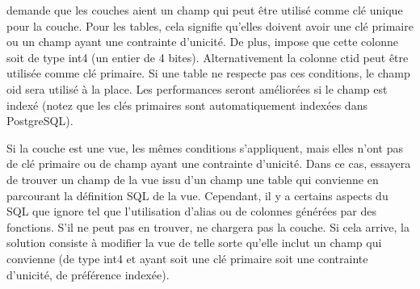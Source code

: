 \qg demande que les couches \psq aient un champ qui peut être utilisé comme clé unique pour la couche. Pour les tables, cela signifie qu'elles doivent avoir une clé primaire ou un champ ayant une contrainte d'unicité. De plus, \qg impose que cette colonne soit de type int4 (un entier de 4 bites). Alternativement la colonne ctid peut être utilisée comme clé primaire. Si une table ne respecte pas ces conditions, le champ oid sera utilisé à la place. Les performances seront améliorées si le champ est indexé (notez que les clés primaires sont automatiquement indexées dans PostgreSQL).

Si la couche \psq est une vue, les mêmes conditions s'appliquent, mais elles n'ont pas de clé primaire ou de champ ayant une contrainte d'unicité. Dans ce cas, \qg essayera de trouver un champ de la vue issu d'un champ une table qui convienne en parcourant la définition SQL de la vue. Cependant, il y a certains aspects du SQL que \qg ignore tel que l'utilisation d'alias ou de colonnes générées par des fonctions. S'il ne peut pas en trouver, \qg ne chargera pas la couche. Si cela arrive, la solution consiste à modifier la vue de telle sorte qu'elle inclut un champ qui convienne (de type int4 et ayant soit une clé primaire soit une contrainte d'unicité, de préférence indexée).

